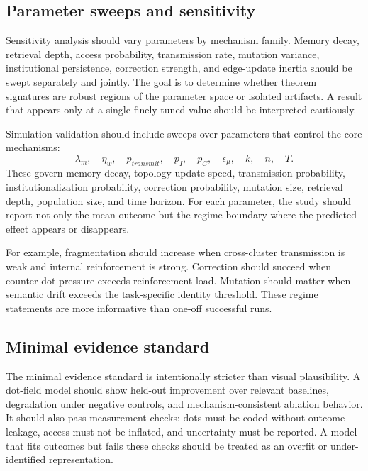 \documentclass[11pt]{article}
\theoremstyle{remark}
\begin{document}
\subsection{Parameter sweeps and sensitivity}\label{parameter-sweeps-sensitivity}

Sensitivity analysis should vary parameters by mechanism family. Memory decay, retrieval depth, access probability, transmission rate, mutation variance, institutional persistence, correction strength, and edge-update inertia should be swept separately and jointly. The goal is to determine whether theorem signatures are robust regions of the parameter space or isolated artifacts. A result that appears only at a single finely tuned value should be interpreted cautiously.


Simulation validation should include sweeps over parameters that control the
core mechanisms:
\[
\lambda_m,\quad \eta_w,\quad p_{transmit},\quad p_I,\quad p_C,\quad
\epsilon_\mu,\quad k,\quad n,\quad T.
\]
These govern memory decay, topology update speed, transmission probability,
institutionalization probability, correction probability, mutation size,
retrieval depth, population size, and time horizon. For each parameter, the
study should report not only the mean outcome but the regime boundary where the
predicted effect appears or disappears.

For example, fragmentation should increase when cross-cluster transmission is
weak and internal reinforcement is strong. Correction should succeed when
counter-dot pressure exceeds reinforcement load. Mutation should matter when
semantic drift exceeds the task-specific identity threshold. These regime
statements are more informative than one-off successful runs.

\subsection{Minimal evidence standard}\label{minimal-evidence-standard}

The minimal evidence standard is intentionally stricter than visual plausibility. A dot-field model should show held-out improvement over relevant baselines, degradation under negative controls, and mechanism-consistent ablation behavior. It should also pass measurement checks: dots must be coded without outcome leakage, access must not be inflated, and uncertainty must be reported. A model that fits outcomes but fails these checks should be treated as an overfit or under-identified representation.
\end{document}
